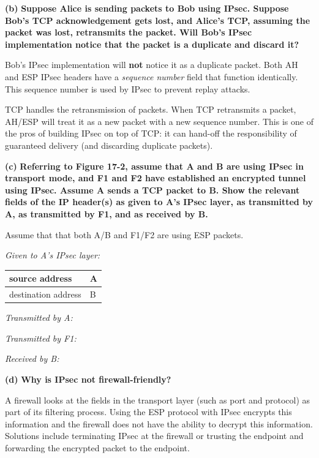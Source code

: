 \documentclass[11pt]{article}
\renewcommand\part[1]{\vspace{.10in}\textbf{(#1)}}
\begin{document}
\part{b} \textbf{Suppose Alice is sending packets to Bob using IPsec. Suppose Bob's TCP acknowledgement gets lost, and Alice's TCP, assuming the packet was lost, retransmits the packet. Will Bob's IPsec implementation notice that the packet is a duplicate and discard it?}

Bob's IPsec implementation will \textbf{not} notice it as a duplicate packet. Both AH and ESP IPsec headers have a \textit{sequence number} field that function identically. This sequence number is used by IPsec to prevent replay attacks.

TCP handles the retransmission of packets. When TCP retransmits a packet, AH/ESP will treat it as a new packet with a new sequence number. This is one of the pros of building IPsec on top of TCP: it can hand-off the responsibility of guaranteed delivery (and discarding duplicate packets).

\part{c} \textbf{Referring to Figure 17-2, assume that A and B are using IPsec in transport mode, and F1 and F2 have established an encrypted tunnel using IPsec. Assume A sends a TCP packet to B. Show the relevant fields of the IP header(s) as given to A's IPsec layer, as transmitted by A, as transmitted by F1, and as received by B.}

Assume that that both A/B and F1/F2 are using ESP packets.

\textit{Given to A's IPsec layer:} 

\begin{tabu} to 0.8\textwidth { | X[c] | X[c] | }
 \hline
 source address & A\\
 \hline
 destination address  & B  \\
\hline
\end{tabu}


\textit{Transmitted by A:} 

\textit{Transmitted by F1:}

\textit{Received by B:}

\part{d} \textbf{Why is IPsec not firewall-friendly?}

A firewall looks at the fields in the transport layer (such as port and protocol) as part of its filtering process. Using the ESP protocol with IPsec encrypts this information and the firewall does not have the ability to decrypt this information. Solutions include terminating IPsec at the firewall or trusting the endpoint and forwarding the encrypted packet to the endpoint.
\end{document}

